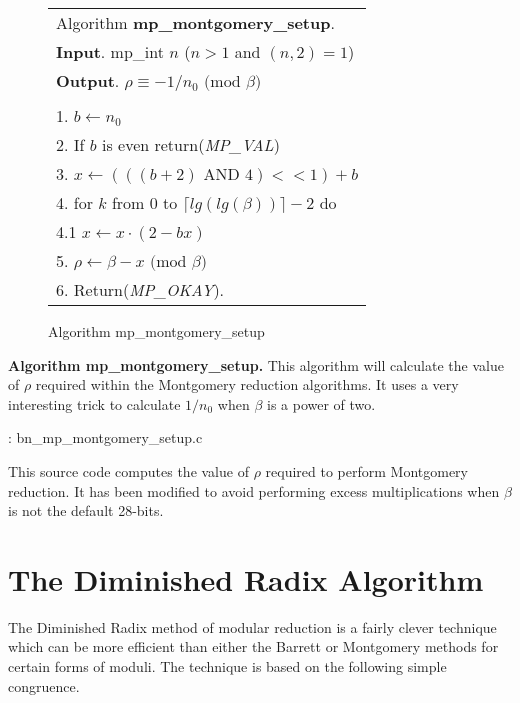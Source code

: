 \documentclass[b5paper]{book}
\begin{document}
\begin{figure}[!here]
\begin{small}
\begin{center}
\begin{tabular}{l}
\hline Algorithm \textbf{mp\_montgomery\_setup}. \\
\textbf{Input}.   mp\_int $n$ ($n > 1$ and $(n, 2) = 1$) \\
\textbf{Output}.  $\rho \equiv -1/n_0 \mbox{ (mod }\beta\mbox{)}$ \\
\hline \\
1.  $b \leftarrow n_0$ \\
2.  If $b$ is even return(\textit{MP\_VAL}) \\
3.  $x \leftarrow (((b + 2) \mbox{ AND } 4) << 1) + b$ \\
4.  for $k$ from 0 to $\lceil lg(lg(\beta)) \rceil - 2$ do \\
\hspace{3mm}4.1  $x \leftarrow x \cdot (2 - bx)$ \\
5.  $\rho \leftarrow \beta - x \mbox{ (mod }\beta\mbox{)}$ \\
6.  Return(\textit{MP\_OKAY}). \\
\hline
\end{tabular}
\end{center}
\end{small}
\caption{Algorithm mp\_montgomery\_setup} 
\end{figure}

\textbf{Algorithm mp\_montgomery\_setup.}
This algorithm will calculate the value of $\rho$ required within the Montgomery reduction algorithms.  It uses a very interesting trick 
to calculate $1/n_0$ when $\beta$ is a power of two.  

\vspace{+3mm}\begin{small}
\hspace{-5.1mm}{\bf File}: bn\_mp\_montgomery\_setup.c
\vspace{-3mm}
\begin{alltt}
\end{alltt}
\end{small}

This source code computes the value of $\rho$ required to perform Montgomery reduction.  It has been modified to avoid performing excess
multiplications when $\beta$ is not the default 28-bits.  

\section{The Diminished Radix Algorithm}
The Diminished Radix method of modular reduction \cite{DRMET} is a fairly clever technique which can be more efficient than either the Barrett
or Montgomery methods for certain forms of moduli.  The technique is based on the following simple congruence.
\end{document}
